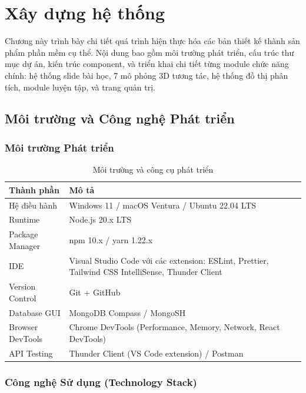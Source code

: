 
\chapter{Xây dựng hệ thống}

Chương này trình bày chi tiết quá trình hiện thực hóa các bản thiết kế thành sản phẩm phần mềm cụ thể. Nội dung bao gồm môi trường phát triển, cấu trúc thư mục dự án, kiến trúc component, và triển khai chi tiết từng module chức năng chính: hệ thống slide bài học, 7 mô phỏng 3D tương tác, hệ thống đồ thị phân tích, module luyện tập, và trang quản trị.

\section{Môi trường và Công nghệ Phát triển}

\subsection{Môi trường Phát triển}

\begin{table}[H]
\centering
\caption{Môi trường và công cụ phát triển}
\begin{tabular}{|p{}|p{}|}
\hline
\textbf{Thành phần} & \textbf{Mô tả} \\
\hline
Hệ điều hành & Windows 11 / macOS Ventura / Ubuntu 22.04 LTS \\
\hline
Runtime & Node.js 20.x LTS \\
\hline
Package Manager & npm 10.x / yarn 1.22.x \\
\hline
IDE & Visual Studio Code với các extension: ESLint, Prettier, Tailwind CSS IntelliSense, Thunder Client \\
\hline
Version Control & Git + GitHub \\
\hline
Database GUI & MongoDB Compass / MongoSH \\
\hline
Browser DevTools & Chrome DevTools (Performance, Memory, Network, React DevTools) \\
\hline
API Testing & Thunder Client (VS Code extension) / Postman \\
\hline
\end{tabular}
\end{table}

\subsection{Công nghệ Sử dụng (Technology Stack)}

